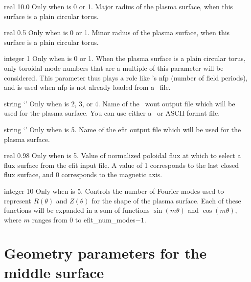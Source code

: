 \myhrule

{real}
{10.0}
{Only when  is 0 or 1.}
{Major radius of the plasma surface, when this surface is a plain circular torus.}

\myhrule

{real}
{0.5}
{Only when  is 0 or 1.}
{Minor radius of the plasma surface, when this surface is a plain circular torus.}

\myhrule

{integer}
{1}
{Only when  is 0 or 1.}
{When the plasma surface is a plain circular torus, only toroidal mode numbers that are a multiple of this parameter will be considered.
This parameter thus plays a role like \vmec's {\ttfamily nfp} (number of field periods),
and is used when {\ttfamily nfp} is not already loaded from a \vmec~file.}

\myhrule

{string}
{`'}
{Only when  is 2, 3, or 4.}
{Name of the \vmec~{\ttfamily wout} output file which will be used for the plasma surface.
You can use either a \netCDF~or {\ttfamily ASCII} format file.}

\myhrule

{string}
{`'}
{Only when  is 5.}
{Name of the {\ttfamily efit} output file which will be used for the plasma surface.}

\myhrule

{real}
{0.98}
{Only when  is 5.}
{Value of normalized poloidal flux at which to select a flux surface from the {\ttfamily efit} input file.
A value of 1 corresponds to the last closed flux surface, and 0 corresponds to the magnetic axis.}

\myhrule

{integer}
{10}
{Only when  is 5.}
{Controls the number of Fourier modes used to represent $R(\theta)$ and $Z(\theta)$ for the shape of
the plasma surface. Each of these functions will be expanded in a sum of functions $\sin(m\theta)$ and $\cos(m\theta)$,
where $m$ ranges from 0 to {\ttfamily efit\_num\_modes}$-1$.}

\section{Geometry parameters for the middle surface}

